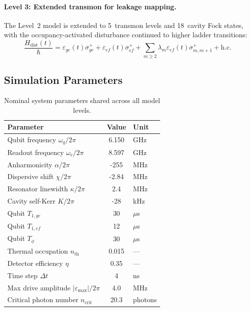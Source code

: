 \documentclass[aps,pra,twocolumn,reprint,amsmath,amssymb]{revtex4-2}
\begin{document}
\paragraph{Level 3: Extended transmon for leakage mapping.}
The Level~2 model is extended to 5~transmon levels and 18~cavity Fock states, with the occupancy-activated disturbance continued to higher ladder transitions:
\begin{equation}
\frac{H_\mathrm{dist}(t)}{\hbar} = \varepsilon_{ge}(t)\sigma_{ge}^+ + \varepsilon_{ef}(t)\sigma_{ef}^+ + \sum_{m\ge 2}\lambda_m\varepsilon_{ef}(t)\sigma_{m,m+1}^+ + \mathrm{h.c.}
\end{equation}

\subsection{Simulation Parameters}

\begin{table}[tp]
\centering
\caption{Nominal system parameters shared across all model levels.}
\begin{tabular}{@{} l S[table-format=+3.3] l @{}}
\toprule
Parameter & {Value} & Unit \\
\midrule
Qubit frequency $\omega_q/2\pi$ & 6.150 & GHz \\
Readout frequency $\omega_r/2\pi$ & 8.597 & GHz \\
Anharmonicity $\alpha/2\pi$ & -255 & MHz \\
Dispersive shift $\chi/2\pi$ & -2.84 & MHz \\
Resonator linewidth $\kappa/2\pi$ & 2.4 & MHz \\
Cavity self-Kerr $K/2\pi$ & -28 & kHz \\
Qubit $T_{1,ge}$ & 30 & $\mu$s \\
Qubit $T_{1,ef}$ & 12 & $\mu$s \\
Qubit $T_\phi$ & 30 & $\mu$s \\
Thermal occupation $n_\mathrm{th}$ & 0.015 & --- \\
Detector efficiency $\eta$ & 0.35 & --- \\
Time step $\Delta t$ & 4 & ns \\
Max drive amplitude $|\varepsilon_\mathrm{max}|/2\pi$ & 4.0 & MHz \\
Critical photon number $n_\mathrm{crit}$ & 20.3 & photons \\
\bottomrule
\end{tabular}
\label{tab:params}
\end{table}
\end{document}
